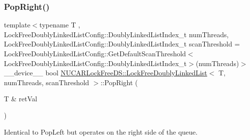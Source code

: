 \subsubsection{\texorpdfstring{Pop\+Right()}{PopRight()}}
{\footnotesize\ttfamily template$<$typename T , Lock\+Free\+Doubly\+Linked\+List\+Config\+::\+Doubly\+Linked\+List\+Index\+\_\+t num\+Threads, Lock\+Free\+Doubly\+Linked\+List\+Config\+::\+Doubly\+Linked\+List\+Index\+\_\+t scan\+Threshold = Lock\+Free\+Doubly\+Linked\+List\+Config\+::\+Get\+Default\+Scan\+Threshold$<$\+Lock\+Free\+Doubly\+Linked\+List\+Config\+::\+Doubly\+Linked\+List\+Index\+\_\+t$>$(num\+Threads)$>$ \\
\+\_\+\+\_\+device\+\_\+\+\_\+ bool \mbox{\hyperlink{class_n_u_c_a_r_lock_free_d_s_1_1_lock_free_doubly_linked_list}{N\+U\+C\+A\+R\+Lock\+Free\+D\+S\+::\+Lock\+Free\+Doubly\+Linked\+List}}$<$ T, num\+Threads, scan\+Threshold $>$\+::Pop\+Right (\begin{DoxyParamCaption}\item[{T \&}]{ret\+Val }\end{DoxyParamCaption})\hspace{0.3cm}{\ttfamily [inline]}}

Identical to Pop\+Left but operates on the right side of the queue. \mbox{\label{class_n_u_c_a_r_lock_free_d_s_1_1_lock_free_doubly_linked_list_aa174dd2ed75ca47e5a56d212558cff21}} 
